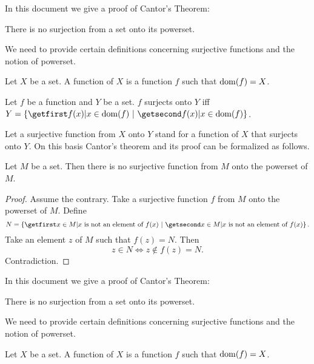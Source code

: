 \documentclass{article}
\begin{document}
In this document we give a proof of Cantor's Theorem:

  \begin{theorem*}
    There is no surjection from a set onto its powerset.
  \end{theorem*}

  We need to provide certain definitions concerning surjective
  functions and the notion of powerset.
\begin{forthel}
\end{forthel}
    \begin{definition*}
      Let $X$ be a set.
      A function of $X$ is a function $f$ such that $\operatorname{dom}(f) = X$.
    \end{definition*}

    \begin{definition*}
      Let $f$ be a function and $Y$ be a set.
      $f$ surjects onto $Y$ iff $Y = \class{f(x) | x \in \dom(f)}$.
    \end{definition*}

    Let a surjective function from $X$ onto $Y$ stand for a function of $X$ that
    surjects onto $Y$.
  On this basis Cantor's theorem and its proof can be formalized as follows.
\begin{forthel}
    \begin{theorem*}[Cantor]
      Let $M$ be a set. Then there is 
      no surjective function from $M$ onto the powerset of $M$.
    \end{theorem*}
    \begin{proof}
      Assume the contrary.
      Take a surjective function $f$ from $M$ onto the powerset of $M$.
      Define \[ N = \class{x \in M | \text{$x$ is not an element of $f(x)$}}. \]
      Take an element $z$ of $M$ such that $f(z) = N$.
      Then \[ z \in N \iff z \notin f(z) = N. \]
      Contradiction.
    \end{proof}
\end{forthel}

In this document we give a proof of Cantor's Theorem:

  \begin{theorem*}
    There is no surjection from a set onto its powerset.
  \end{theorem*}

  We need to provide certain definitions concerning surjective
  functions and the notion of powerset.

    \begin{definition*}
      Let $X$ be a set.
      A function of $X$ is a function $f$ such that $\operatorname{dom}(f) = X$.
    \end{definition*}
\end{document}
